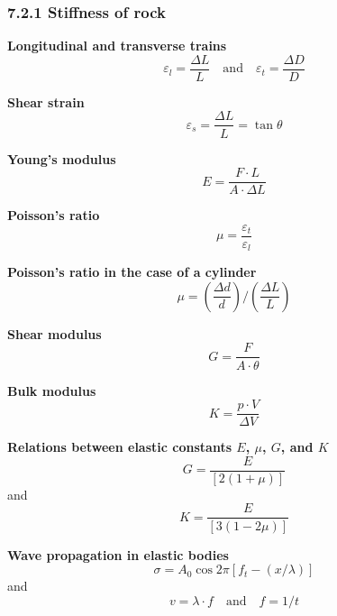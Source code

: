 \subsubsection{7.2.1 Stiffness of rock}
\textbf{Longitudinal and transverse trains}
\begin{equation*}
    \varepsilon_l = \frac{\Delta L}{L}\quad\mathrm{and}\quad\varepsilon_t=\frac{\Delta D}{D}\tag{7.2, 7.3}
\end{equation*}

\textbf{Shear strain}
\begin{equation*}
    \varepsilon_s = \frac{\Delta L}{L} = \tan\theta\tag{7.4}
\end{equation*}

\textbf{Young's modulus}
\begin{equation*}
    E = \frac{F\cdot L}{A\cdot\Delta L}\tag{7.5}
\end{equation*}

\textbf{Poisson's ratio}
\begin{equation*}
    \mu = \frac{\varepsilon_t}{\varepsilon_l}\tag{7.6}
\end{equation*}

\textbf{Poisson's ratio in the case of a cylinder}
\begin{equation*}
    \mu = \left( \frac{\Delta d}{d} \right) / \left( \frac{\Delta L}{L} \right)\tag{7.7}
\end{equation*}

\textbf{Shear modulus}
\begin{equation*}
    G = \frac{F}{A\cdot\theta}\tag{7.8}
\end{equation*}

\textbf{Bulk modulus}
\begin{equation*}
    K = \frac{p\cdot V}{\Delta V}\tag{7.9}
\end{equation*}

\textbf{Relations between elastic constants $E$, $\mu$, $G$, and $K$}
\begin{equation*}
    G = \frac{E}{\left[ 2(1+\mu) \right]}\tag{7.10}
\end{equation*}
and
\begin{equation*}
    K = \frac{E}{\left[ 3(1 - 2\mu) \right]}\tag{7.11}
\end{equation*}

\textbf{Wave propagation in elastic bodies}
\begin{equation*}
    \sigma = A_0\cos2\pi\left[ f_t - (x/\lambda) \right]\tag{7.12}
\end{equation*}
and
\begin{equation*}
    v = \lambda\cdot f\quad\mathrm{and}\quad f=1 / t \tag{7.13, 7.14}
\end{equation*}

